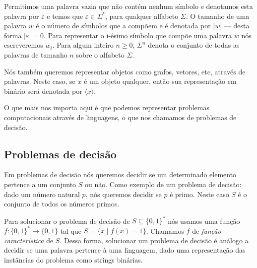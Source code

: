 Permitimos uma palavra vazia que não contém nenhum símbolo e denotamos esta palavra por $\varepsilon$ e temos que $\varepsilon \in \Sigma^{*}$, para qualquer alfabeto $\Sigma$. O tamanho de uma palavra $w$ é o número de símbolos que a compõem e é denotada por $\lvert w \rvert$ --- desta forma $\lvert \varepsilon \rvert = 0$. Para representar o i-ésimo símbolo que compõe uma palavra $w$ nós escreveremos $w_{i}$. Para algum inteiro $n \geq 0$, $\Sigma^{n}$ denota o conjunto de todas as palavras de tamanho $n$ sobre o alfabeto $\Sigma$.

Nós também queremos representar objetos como grafos, vetores, etc, através de palavras. Neste caso, se $x$ é um objeto qualquer, então sua representação em binário será denotada por $\langle x \rangle$.



O que mais nos importa aqui é que podemos representar problemas computacionais através de linguagens, o que nos chamamos de problemas de decisão.

\subsection{Problemas de decisão}

Em problemas de decisão nós queremos decidir se um determinado elemento pertence a um conjunto $S$ ou não. Como exemplo de um problema de decisão: dado um número natural $p$, nós queremos decidir se $p$ é primo. Neste caso $S$ é o conjunto de todos os números primos. 

Para solucionar o problema de decisão de $S \subseteq \{0, 1\}^{*}$ nós usamos uma função $f: \{0, 1\}^{*} \to \{0, 1\}$ tal que $S = \{x \mid f(x) = 1\}$. Chamamos $f$ de \emph{função característica} de $S$. Dessa forma, solucionar um problema de decisão é análogo a decidir se uma palavra pertence à uma linguagem, dado uma representação das instâncias do problema como strings binárias.




